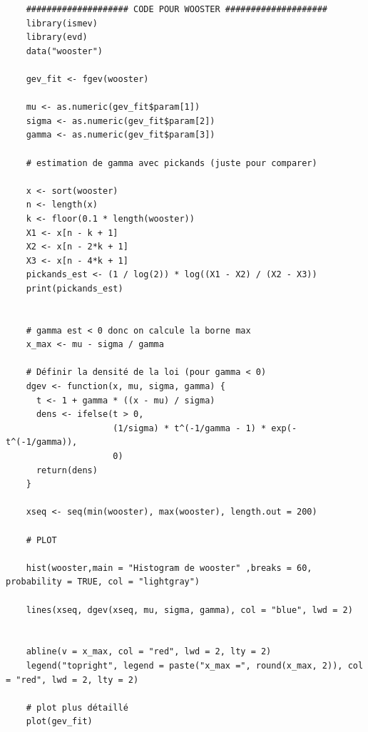 \documentclass{article}
\theoremstyle{plain}
\theoremstyle{definition}
\theoremstyle{plain}
\begin{document}
\begin{lstlisting}
	#################### CODE POUR WOOSTER ####################
	library(ismev)
	library(evd)
	data("wooster")
	
	gev_fit <- fgev(wooster)
	
	mu <- as.numeric(gev_fit$param[1])
	sigma <- as.numeric(gev_fit$param[2])
	gamma <- as.numeric(gev_fit$param[3])
	
	# estimation de gamma avec pickands (juste pour comparer)
	
	x <- sort(wooster)
	n <- length(x)
	k <- floor(0.1 * length(wooster))
	X1 <- x[n - k + 1]
	X2 <- x[n - 2*k + 1]
	X3 <- x[n - 4*k + 1]
	pickands_est <- (1 / log(2)) * log((X1 - X2) / (X2 - X3))
	print(pickands_est)
	
	
	# gamma est < 0 donc on calcule la borne max
	x_max <- mu - sigma / gamma
	
	# Définir la densité de la loi (pour gamma < 0)
	dgev <- function(x, mu, sigma, gamma) {
	  t <- 1 + gamma * ((x - mu) / sigma)
	  dens <- ifelse(t > 0, 
					 (1/sigma) * t^(-1/gamma - 1) * exp(-t^(-1/gamma)), 
					 0)
	  return(dens)
	}
	
	xseq <- seq(min(wooster), max(wooster), length.out = 200)
	
	# PLOT   
	
	hist(wooster,main = "Histogram de wooster" ,breaks = 60, probability = TRUE, col = "lightgray")
	
	lines(xseq, dgev(xseq, mu, sigma, gamma), col = "blue", lwd = 2)
	
	
	abline(v = x_max, col = "red", lwd = 2, lty = 2)
	legend("topright", legend = paste("x_max =", round(x_max, 2)), col = "red", lwd = 2, lty = 2)
	
	# plot plus détaillé
	plot(gev_fit)



	
\end{lstlisting}
\end{document}
